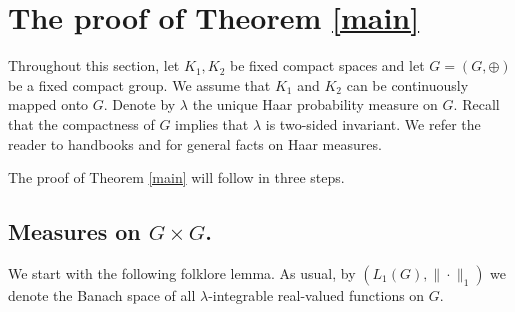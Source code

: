 \documentclass[12pt,fleqn]{amsart}
\numberwithin{equation}{section}
\theoremstyle{definition}
\begin{document}
\medskip


\section{The proof of Theorem \ref{main}}\label{mainproof}

Throughout this section, let $K_1,K_2$ be fixed compact spaces and let $G=(G,\oplus)$ be a fixed compact group. We assume that $K_1$ and $K_2$ can be continuously mapped onto $G$. Denote by $\lambda$ the unique Haar probability measure on $G$. Recall that the compactness of $G$ implies that $\lambda$ is two-sided invariant. We refer the reader to handbooks \cite[Section 11.1]{Folland} and \cite[Chapter 5]{Rudin} for general facts on Haar measures.

The proof of Theorem \ref{main} will follow in three steps.

\subsection{Measures on $G\times G$.} 

We start with the following folklore lemma. As usual, by $(L_1(G),\|\cdot\|_1)$ we denote the Banach space of all $\lambda$-integrable real-valued functions on $G$.
\end{document}
